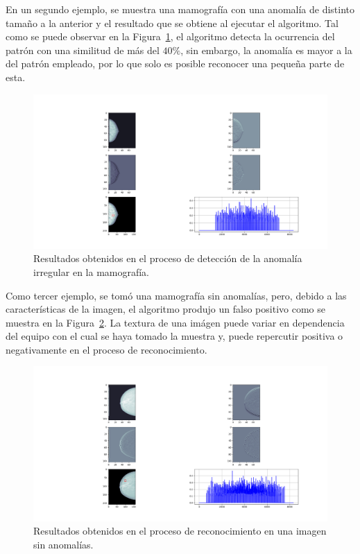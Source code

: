 \par En un segundo ejemplo, se muestra una mamograf\'ia con una anomal\'ia de distinto tama\~no a la anterior y el resultado que se obtiene al ejecutar el algoritmo. Tal como se puede observar en la Figura~\ref{detect-anomalia-piece}, el algoritmo detecta la ocurrencia del patr\'on con una similitud de m\'as del $40\%$, sin embargo, la anomal\'ia es mayor a la del patr\'on empleado, por lo que solo es posible reconocer una peque\~na parte de esta.

\begin{figure}[h]
\center
\includegraphics[scale=.3]{Graphics/MamografiaDetectPiece.png}
\caption{Resultados obtenidos en el proceso de detecci\'on de la anomal\'ia irregular en la mamograf\'ia.}
\label{detect-anomalia-piece}
\end{figure}

\par Como tercer ejemplo, se tom\'o una mamograf\'ia sin anomal\'ias, pero, debido a las caracter\'isticas de la imagen, el algoritmo produjo un falso positivo como se muestra en la Figura~\ref{detect-anomalia-fail}. La textura de una im\'agen puede variar en dependencia del equipo con el cual se haya tomado la muestra y, puede repercutir positiva o negativamente en el proceso de reconocimiento.

\begin{figure}[h]
\center
\includegraphics[scale=.3]{Graphics/MamografiaDetectFail.png}
\caption{Resultados obtenidos en el proceso de reconocimiento en una imagen sin anomal\'ias.}
\label{detect-anomalia-fail}
\end{figure}

